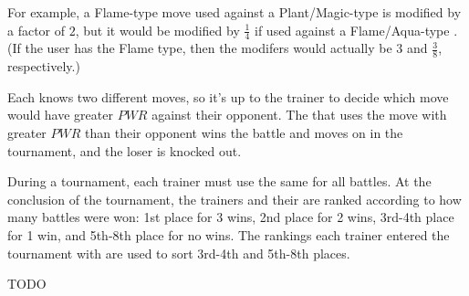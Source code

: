 For example, a Flame-type move used against a Plant/Magic-type
\mappMobimon{} is modified by a factor of \(2\), but it
would be modified by \(\frac{1}{4}\) if used against a Flame/Aqua-type
\mappMobimon{}. (If the user has the Flame type, then the modifers would
actually be \(3\) and \(\frac{3}{8}\), respectively.)

Each \mappMobimon{} knows two different moves, so it's up to the
trainer to decide which move would have greater \(PWR\) against their
opponent. The \mappMobimon{} that uses the move with greater \(PWR\) than
their opponent wins the battle and moves on in the tournament, and the
loser is knocked out.

During a tournament, each trainer must use the same \mappMobimon{} for all
battles. At the conclusion of the tournament, the trainers and their
\mappMobimon{} are ranked according
to how many battles were won: 1st place for 3 wins, 2nd place for 2 wins,
3rd-4th place for 1 win, and 5th-8th place for no wins. The rankings each
trainer entered the tournament with are used to sort 3rd-4th and 5th-8th
places.


TODO



